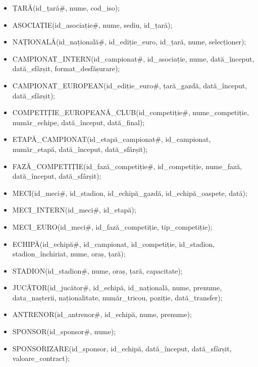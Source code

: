 \documentclass{article}
\begin{document}
	\begin{itemize}[left = 0cm]
		\item[] ȚARĂ(id\_țară\#, nume, cod\_iso);
		
		\item[] ASOCIAȚIE(id\_asociație\#, nume, sediu, id\_țară);
		
		\item[] NAȚIONALĂ(id\_națională\#, id\_ediție\_euro, id\_țară, nume, selecționer);
		
		\item[] CAMPIONAT\_INTERN(id\_campionat\#, id\_asociație, nume, dată\_început, dată\_sfârșit, format\_desfășurare);
		
		\item[] CAMPIONAT\_EUROPEAN(id\_ediție\_euro\#, țară\_gazdă, dată\_început, dată\_sfârșit);
		
		\item[] COMPETIȚIE\_EUROPEANĂ\_CLUB(id\_competiție\#, nume\_competiție, număr\_echipe, dată\_început, dată\_final);
		
		\item[] ETAPĂ\_CAMPIONAT(id\_etapă\_campionat\#, id\_campionat, număr\_etapă, dată\_început, dată\_sfârșit);
		
		\item[] FAZĂ\_COMPETIȚIE(id\_fază\_competiție\#, id\_competiție, nume\_fază, dată\_început, dată\_sfârșit);
		
		\item[] MECI(id\_meci\#, id\_stadion, id\_echipă\_gazdă, id\_echipă\_oaspete, dată);
		
		\item[] MECI\_INTERN(id\_meci\#, id\_etapă);
		
		\item[] MECI\_EURO(id\_meci\#, id\_fază\_competiție, tip\_competiție);
		
		\item[] ECHIPĂ(id\_echipă\#, id\_campionat, id\_competiție, id\_stadion, stadion\_închiriat, nume, oraș, țară);
		
		\item[] STADION(id\_stadion\#, nume, oraș, țară, capacitate);
		
		\item[] JUCĂTOR(id\_jucător\#, id\_echipă, id\_națională, nume, prenume, data\_nașterii, naționalitate, număr\_tricou, poziție, dată\_transfer);
		
		\item[] ANTRENOR(id\_antrenor\#, id\_echipă, nume, prenume);
		
		\item[] SPONSOR(id\_sponsor\#, nume);
		
		\item[] SPONSORIZARE(id\_sponsor, id\_echipă, dată\_început, dată\_sfârșit, valoare\_contract);
		
		
		
	\end{itemize}
	
\end{document}
